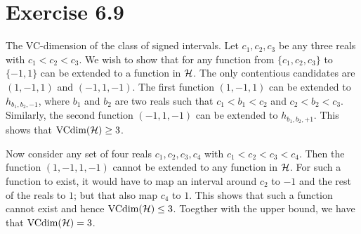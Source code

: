 \section*{Exercise 6.9}

The VC-dimension of the class of signed intervals. Let $c_1, c_2, c_3$ be any
three reals with $c_1 < c_2 < c_3$. We wish to show that for any function from
$\{c_1, c_2, c_3\}$ to $\{-1, 1\}$ can be extended to a function in
$\mathcal{H}$.  The only contentious candidates are $(1, -1, 1)$ and $(-1, 1,
-1)$. The first function $(1, -1, 1)$ can be extended to $h_{b_1, b_2, -1}$,
where $b_1$ and $b_2$ are two reals such that $c_1 < b_1 < c_2$ and $c_2 < b_2
< c_3$. Similarly, the second function $(-1, 1, -1)$ can be extended to
$h_{b_1, b_2, +1}$. This shows that $\text{VCdim} (\mathcal{H}) \geq 3$. 

Now consider any set of four reals $c_1, c_2, c_3, c_4$ with $c_1 < c_2 < c_3 <
c_4$.  Then the function $(1, -1, 1, -1)$ cannot be extended to any function in
$\mathcal{H}$.  For such a function to exist, it would have to map an interval
around $c_2$ to $-1$ and the rest of the reals to $1$; but that also map $c_4$
to $1$. This shows that such a function cannot exist and hence 
$\text{VCdim} (\mathcal{H}) \leq 3$. Toegther with the upper bound, we have 
that $\text{VCdim}(\mathcal{H}) = 3$.  
